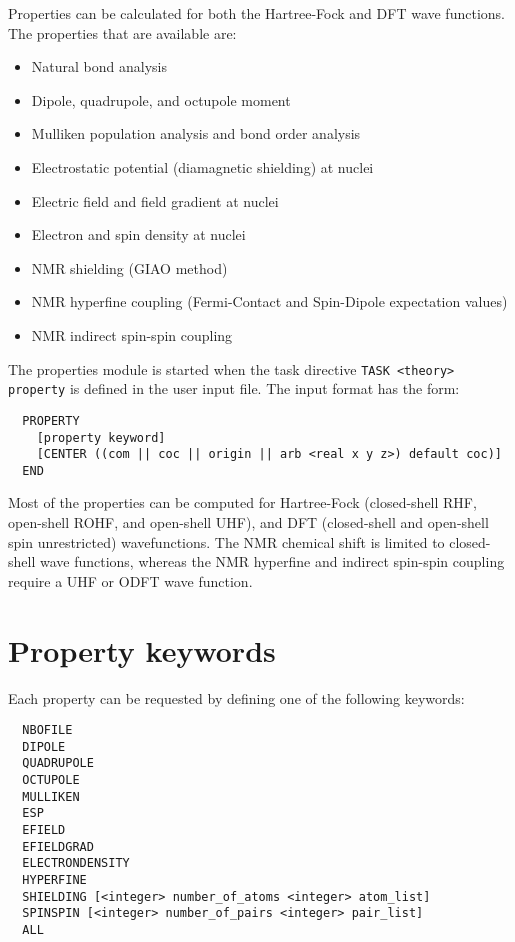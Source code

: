 %
%
\label{sec:property}

Properties can be calculated for both the Hartree-Fock and DFT wave 
functions. The properties that are available are:

\begin{itemize}
\item Natural bond analysis
\item Dipole, quadrupole, and octupole moment 
\item Mulliken population analysis and bond order analysis
\item Electrostatic potential (diamagnetic shielding) at nuclei 
\item Electric field and field gradient at nuclei 
\item Electron and spin density at nuclei 
\item NMR shielding (GIAO method)
\item NMR hyperfine coupling (Fermi-Contact and Spin-Dipole expectation values)
\item NMR indirect spin-spin coupling
\end{itemize}

The properties module is started when the task directive
\verb+TASK <theory> property+ is defined in the user input file. The input 
format has the form:

\begin{verbatim}
  PROPERTY
    [property keyword]
    [CENTER ((com || coc || origin || arb <real x y z>) default coc)]
  END
\end{verbatim}

Most of the properties can be computed for Hartree-Fock
(closed-shell RHF, open-shell ROHF, and open-shell UHF), and DFT
(closed-shell and open-shell spin unrestricted) wavefunctions. The NMR
chemical shift is limited to closed-shell wave functions, whereas the NMR 
hyperfine and indirect spin-spin coupling require a UHF or ODFT wave function.

\section{Property keywords}

Each property can be requested by defining one of the following keywords:

\begin{verbatim}
  NBOFILE
  DIPOLE
  QUADRUPOLE
  OCTUPOLE
  MULLIKEN
  ESP
  EFIELD
  EFIELDGRAD
  ELECTRONDENSITY
  HYPERFINE
  SHIELDING [<integer> number_of_atoms <integer> atom_list]
  SPINSPIN [<integer> number_of_pairs <integer> pair_list]
  ALL
\end{verbatim}

